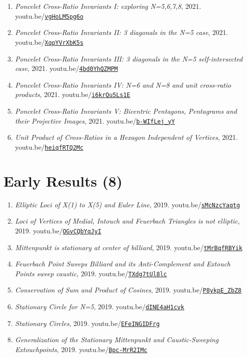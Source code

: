 \documentclass[12pt]{article}
\begin{document}
\begin{enumerate}[resume]
\item \textit{Poncelet Cross-Ratio Invariants I: exploring N=5,6,7,8}, 2021. youtu.be/\href{https://youtu.be/vgHoLM5pg6o}{\nolinkurl{vgHoLM5pg6o}}
\item \textit{Poncelet Cross-Ratio Invariants II: 3 diagonals in the N=5 case}, 2021. youtu.be/\href{https://youtu.be/XqpYVrXbK5s}{\nolinkurl{XqpYVrXbK5s}}
\item \textit{Poncelet Cross-Ratio Invariants III: 3 diagonals in the N=5 self-intersected case}, 2021. youtu.be/\href{https://youtu.be/4bd0YhQZMPM}{\nolinkurl{4bd0YhQZMPM}}
\item \textit{Poncelet Cross-Ratio Invariants IV: N=6 and N=8 and unit cross-ratio products}, 2021. youtu.be/\href{https://youtu.be/i6krQu5Ls1E}{\nolinkurl{i6krQu5Ls1E}}
\item \textit{Poncelet Cross-Ratio Invariants V: Bicentric Pentagons, Pentagrams and their Projective Images}, 2021. youtu.be/\href{https://youtu.be/b-WIfLej_yY}{\nolinkurl{b-WIfLej\_yY}}
\item \textit{Unit Product of Cross-Ratios in a Hexagon Independent of Vertices}, 2021. youtu.be/\href{https://youtu.be/heiqfRTQ2Mc}{\nolinkurl{heiqfRTQ2Mc}}
\end{enumerate}

\section{Early Results (8)}

\begin{enumerate}[resume]
\item \textit{Elliptic Loci of X(1) to X(5) and Euler Line}, 2019. youtu.be/\href{https://youtu.be/sMcNzcYaqtg}{\nolinkurl{sMcNzcYaqtg}}
\item \textit{Loci of Vertices of Medial, Intouch and Feuerbach Triangles is not elliptic}, 2019. youtu.be/\href{https://youtu.be/OGvCQbYqJyI}{\nolinkurl{OGvCQbYqJyI}}
\item \textit{Mittenpunkt is stationary at center of billiard}, 2019. youtu.be/\href{https://youtu.be/tMrBqfRBYik}{\nolinkurl{tMrBqfRBYik}}
\item \textit{Feuerbach Point Sweeps Billiard and its Anti-Complement and Extouch Points sweep caustic}, 2019. youtu.be/\href{https://youtu.be/TXdg7tUl8lc}{\nolinkurl{TXdg7tUl8lc}}
\item \textit{Conservation of Sum and Product of Cosines}, 2019. youtu.be/\href{https://youtu.be/P8ykpE_ZbZ8}{\nolinkurl{P8ykpE\_ZbZ8}}
\item \textit{Stationary Circle for N=5}, 2019. youtu.be/\href{https://youtu.be/dINE4aH1cvk}{\nolinkurl{dINE4aH1cvk}}
\item \textit{Stationary Circles}, 2019. youtu.be/\href{https://youtu.be/EFeINGIDFrg}{\nolinkurl{EFeINGIDFrg}}
\item \textit{Generalization of the Stationary Mittenpunkt and Caustic-Sweeping Extouchpoints}, 2019. youtu.be/\href{https://youtu.be/Bpc-MrR2IMc}{\nolinkurl{Bpc-MrR2IMc}}
\end{enumerate}
\end{document}
